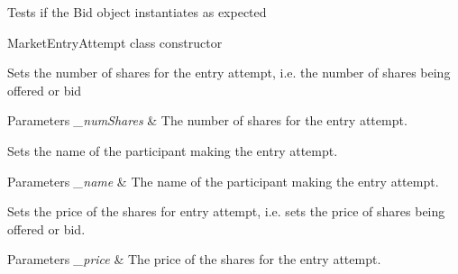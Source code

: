 
\begin{DoxyRefList}
\item[\label{todo__todo000017}%
\hypertarget{todo__todo000017}{}%
Member \hyperlink{class_bid_unit_test_a00b30251528b2203d6d9f17c321bc499}{Bid\+Unit\+Test.instantiation} ()]Tests if the Bid object instantiates as expected  
\item[\label{todo__todo000001}%
\hypertarget{todo__todo000001}{}%
Member \hyperlink{classfinancialmarketsimulator_1_1_market_entry_attempt_a9b2f8a9eef7975bc053907e2ea05c779}{financialmarketsimulator.Market\+Entry\+Attempt.Market\+Entry\+Attempt} (double pr, int num\+Shares, String name)]Market\+Entry\+Attempt class constructor 
\item[\label{todo__todo000003}%
\hypertarget{todo__todo000003}{}%
Member \hyperlink{classfinancialmarketsimulator_1_1_market_entry_attempt_a27476573fd4a0aa03270c648500a3c98}{financialmarketsimulator.Market\+Entry\+Attempt.set\+Number\+Of\+Shares} (int \+\_\+num\+Shares)]Sets the number of shares for the entry attempt, i.\+e. the number of shares being offered or bid 
\begin{DoxyParams}{Parameters}
{\em \+\_\+num\+Shares} & The number of shares for the entry attempt.  \\
\hline
\end{DoxyParams}

\item[\label{todo__todo000004}%
\hypertarget{todo__todo000004}{}%
Member \hyperlink{classfinancialmarketsimulator_1_1_market_entry_attempt_af2b5d63e0ac8d2e39cf474e128739c8a}{financialmarketsimulator.Market\+Entry\+Attempt.set\+Participant\+Name} (String \+\_\+name)]Sets the name of the participant making the entry attempt. 
\begin{DoxyParams}{Parameters}
{\em \+\_\+name} & The name of the participant making the entry attempt.  \\
\hline
\end{DoxyParams}

\item[\label{todo__todo000002}%
\hypertarget{todo__todo000002}{}%
Member \hyperlink{classfinancialmarketsimulator_1_1_market_entry_attempt_ac350f88eed14da376cb58aa920df2f38}{financialmarketsimulator.Market\+Entry\+Attempt.set\+Price} (double \+\_\+price)]Sets the price of the shares for entry attempt, i.\+e. sets the price of shares being offered or bid. 
\begin{DoxyParams}{Parameters}
{\em \+\_\+price} & The price of the shares for the entry attempt.  \\
\hline
\end{DoxyParams}


\end{DoxyRefList}
